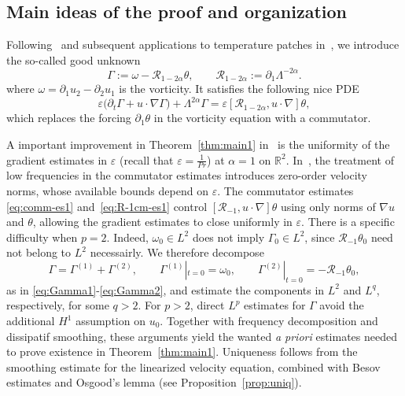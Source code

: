\documentclass[reqno,11pt,a4paper]{amsart}
\begin{document}
\subsection{Main ideas of the proof and organization}

Following~\cite{HKR10,HKR11}
and subsequent applications to temperature patches
in~\cite{CMX22,KX22,LXY25},
we introduce the so-called good unknown
\[
  \Gamma:=\omega-\mathcal R_{1-2\alpha}\theta,
  \qquad
  \mathcal R_{1-2\alpha}:=\partial_1\Lambda^{-2\alpha}.
\]
where $\omega=\partial_1u_2-\partial_2u_1$
is the vorticity.
It satisfies the following nice PDE
\begin{equation}\label{eq:Gamma-intr}
  \varepsilon\bigl(\partial_t\Gamma+u\cdot\nabla\Gamma\bigr)
  +\Lambda^{2\alpha}\Gamma
  =
  \varepsilon
  [\mathcal R_{1-2\alpha},u\cdot\nabla]\theta,
\end{equation}
which replaces the forcing $\partial_1\theta$
in the vorticity equation with a commutator.

A important improvement in Theorem~\ref{thm:main1}
in~\cite{LXY25} is the uniformity of the gradient estimates
in $\varepsilon$ (recall that $\varepsilon=\frac{1}{Pr}$) at $\alpha=1$ on $\mathbb R^2$.
In~\cite{LXY25}, the treatment of low frequencies
in the commutator estimates introduces zero-order
velocity norms, whose available bounds depend on $\varepsilon$.
The commutator estimates \eqref{eq:comm-es1}
and~\eqref{eq:R-1cm-es1} control
$[\mathcal R_{-1},u\cdot\nabla]\theta$
using only norms of $\nabla u$ and $\theta$,
allowing the gradient estimates to close
uniformly in $\varepsilon$.
There is a specific difficulty when $p=2$. Indeed, 
$\omega_0\in L^2$ does not imply $\Gamma_0\in L^2$,
since $\mathcal R_{-1}\theta_0$ need not belong to  $L^2$ necessairly.
We therefore decompose
\[
  \Gamma=\Gamma^{(1)}+\Gamma^{(2)},\qquad
  \Gamma^{(1)}|_{t=0}=\omega_0,\qquad
  \Gamma^{(2)}|_{t=0}=-\mathcal R_{-1}\theta_0,
\]
as in \eqref{eq:Gamma1}-\eqref{eq:Gamma2},
and estimate the components in $L^2$ and $L^q$,
respectively, for some $q>2$.
For $p>2$, direct $L^p$ estimates for $\Gamma$
avoid the additional $H^1$ assumption on $u_0$.
Together with frequency decomposition and dissipatif
smoothing, these arguments yield the wanted \textit{{\it{a priori}}} estimates
needed to prove existence in Theorem~\ref{thm:main1}.
Uniqueness follows from the smoothing estimate
for the linearized velocity equation,
combined with Besov estimates and Osgood's lemma (see Proposition~\ref{prop:uniq}).
\end{document}
